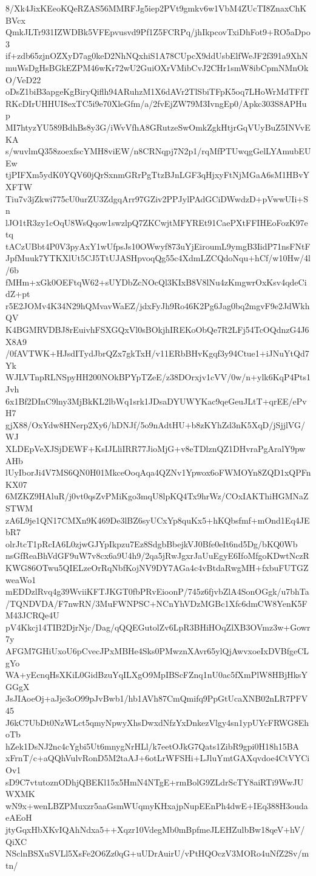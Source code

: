 8/Xk4JixKEeoKQeRZAS56MMRFJg5iep2PVt9gmkv6w1VbM4ZUcTI8ZnaxChKBVcx
QmkJLTr931IZWDBk5VFEpvusvd9Pf1Z5FCRPq/jhIkpcovTxiDhFot9+RO5aDpo3
if+zdb65zjnOZXyD7ag0keD2NhNQxhiS1A78CUpcX9ddUsbElfWeJF2f391a9XhN
muWsDgHsBGkEZPM46wKr72wU2GuiOXrVMibCvJ2CHr1smW8ibCpmNMnOkO/VeD22
oDsZ1biB3apgeKgBiryQiflh94ARuhzM1X6dAVr2TlSbiTFpK5oq7LHoWrMdTFfT
RKcDIrUHHUI8exTC5i9e70XleGfm/a/2fvEjZW79M3IvngEp0/Apkc303S8APHup
MI7htyzYU589BdhBs8y3G/iWvVfhA8GRutzeSwOmkZgkHtjrGqVUyBuZ5INVvEKA
s/wuvlmQ358zoexfscYMH8viEW/n8CRNqpj7N2p1/rqMfPTUwqgGelLYAmubEUEw
tjPIFXm5ydK0YQV60jQrSxnmGRrPgTtzBJnLGF3qHjxyFtNjMGaA6sM1HBvYXFTW
Tiu7v3jZkwi775cU0urZU3ZdgqArr97GZiv2PPJylPAdGCiDWwdzD+pVwwUIi+Sn
lJO1tR3zy1cOqU8WsQqow1swzlpQ7ZKCwjtMFYREt91CaePXtFFIHEoFozK97etq
tACzUBbt4P0V3pyAxY1wUfpsJs10OWwyf873uYjEiroumL9ymgB3IidP71nsFNtF
JpfMuuk7YTKXlUt5CJ5TtUJASHpvoqQg55c4XdmLZCQdoNqu+hCf/w10Hw/4l/6b
fMHm+xGk0OEFtqW62+sUYDbZcNOcQl3KIxB8V8lNu4zKmgwrOxKsv4qdeCidZ+pt
r5E2JOMv4K34N29hQMvavWaEZ/jdxFyJh9Ro46K2Pg6Jag0bq2mgvF9e2JdWkhQV
K4BGMRVDBJ8rEuivhFSXGQxVl0sBOkjhIREKoObQe7R2LFj54TcOQdnzG4J6X8A9
/0fAVTWK+HJsdITydJbrQZx7gkTxH/v11ERbBHvKgqf3y94Ctue1+iJNuYtQd7Yk
WJLVTnpRLNSpyHH200NOkBPYpTZeE/z38DOrxjv1cVV/0w/n+ylk6KqP4Pts1Jvh
6x1Bf2DInC9lny3MjBkKL2lbWq1srk1JDsaDYUWYKac9qeGeuJLtT+qrEE/ePvH7
gjX88/OxYdw8HNerp2Xy6/hDNJf/5o9nAdtHU+b8zKYhZd3nK5XqD/jSjjlVG/WJ
XLDEpVeXJSjDEWF+KsIJLliIRR77JioMjG+v8eTDlznQZ1DHvraPgAralY9pwAHb
lUyIborJi4V7MS6QN0H01MkceOoqAqa4QZNv1Ypwox6oFWMOYn8ZQD1xQPFnKX07
6MZKZ9HAluR/j0vt0qsZvPMiKgo3mqU8lpKQ4Tx9hrWz/COxIAKThiHGMNaZSTWM
zA6L9je1QN17CMXn9K469De3lBZ6syUCxYp8quKx5+hKQbsfmf+mOnd1Eq4JEbR7
olrJtcT1pRcIA6L0zjwGJYpIkpzu7Ez8SdgbBbejkVJ0Bfe0eIt6nd5Dg/bKQ0Wb
nsGfReaBhVdGF9uW7v8cx6a9U4h9/2qa5jRwJgxrJaUuEgyE6IfoMfgoKDwtNczR
KWG86OTwu5QIELzeOrRqNbfKojNV9DY7AGa4c4vBtdaRwgMH+fxbuFUTGZweaWo1
mEDDzlRvq4g39WviiKFTJKGT0fbPRvEioonP/745z6fjvbZlA4SonOGgk/u7bhTa
/TQNDVDA/F7nwRN/3MuFWNPSC+NCnYhVDzMGBc1Xfc6dmCW8YenK5FM43JCRQe4U
pV4Kkcj14TIB2DjrNjc/Dag/qQQEGutolZv6LpR3BHiHOqZlXB3OVmz3w+Gowr7y
AFGM7GHiUxoU6pCvecJPxMBHe4Sks0PMwznXAvr65ylQjAwvxoeIxDVBfgeCLgYo
WA+yEcnqHsXKiL0GidBzuYqILXgO9MpIBScFZnq1nU0ac5fXmPlW8HBjHksYGGgX
JsJIAoeOj+aJje3oO99pJvBwb1/hb1AVh87CmQmifq9PpGtUcaXNB02nLR7PFV45
J6kC7UbDt0NzWLct5qmyNpwyXhsDwxdNfzYxDnkezVlgy4sn1ypUYcFRWG8EhoTb
hZek1DsNJ2nc4cYgbi5Ut6mnygNrHLl/k7eetOJkG7Qats1ZibR9gpi0H18h15BA
xFrnT/c+aQQhVulvRonD5M2taAJ+6otLrWFSHi+LJluYmtGAXqvdoe4CtVYCiOv1
sD9C7vtutoznODhjQBEKl15x5HmN4NTgE+rmBolG9ZLdrScTY8aiRTi9WwJUWXMK
wN9x+wenLBZPMuxzr5aaGsmWUqmyKHxajpNupEEnPh4dwE+IEq388H3oudaeAEoH
jtyGqxHbXKvIQAhNdxa5++Xqzr10VdegMb0mBpfmeJLEHZulbBw18qeV+hV/QiXC
NSclnBSXuSVLl5XsFe2O6Zz0qG+uUDrAuirU/vPtHQOczV3MORo4uNfZ2Sv/mtn/
